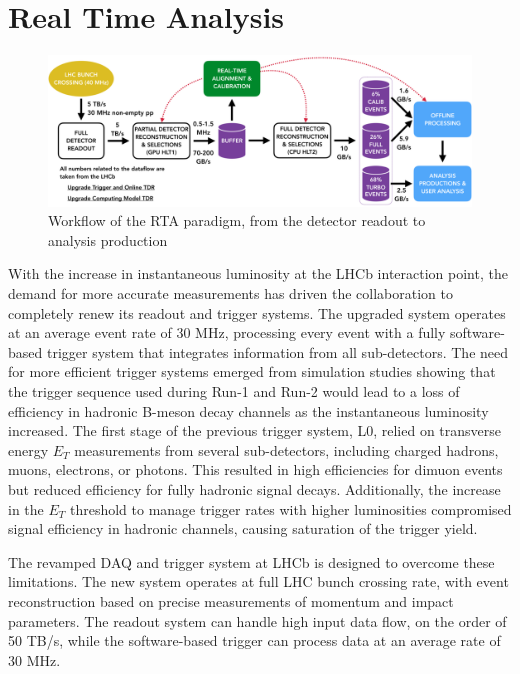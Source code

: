 \section{Real Time Analysis}\label{sec:rta}
\begin{figure}
    \centering
    \includegraphics[width=\textwidth]{figures/hidef_RTA_dataflow_widescreen.png}
    \caption{Workflow of the RTA paradigm, from the detector readout to analysis production}
    \label{fig:RTA}
\end{figure}
With the increase in instantaneous luminosity at the LHCb interaction point, the demand for more accurate measurements has driven the collaboration to completely renew its readout and trigger systems. The upgraded system operates at an average event rate of 30 MHz, processing every event with a fully software-based trigger system that integrates information from all sub-detectors. The need for more efficient trigger systems emerged from simulation studies showing that the trigger sequence used during Run-1 and Run-2 would lead to a loss of efficiency in hadronic B-meson decay channels as the instantaneous luminosity increased\cite{CERN-LHCC-2011-001}. The first stage of the previous trigger system, L0, relied on transverse energy $E_T$ measurements from several sub-detectors, including charged hadrons, muons, electrons, or photons. This resulted in high efficiencies for dimuon events but reduced efficiency for fully hadronic signal decays. Additionally, the increase in the $E_T$ threshold to manage trigger rates with higher luminosities compromised signal efficiency in hadronic channels, causing saturation of the trigger yield.

The revamped DAQ and trigger system at LHCb is designed to overcome these limitations\cite{CERN-LHCC-2018-014}. The new system operates at full LHC bunch crossing rate, with event reconstruction based on precise measurements of momentum and impact parameters. The readout system can handle high input data flow, on the order of 50 TB/s, while the software-based trigger can process data at an average rate of 30 MHz.

